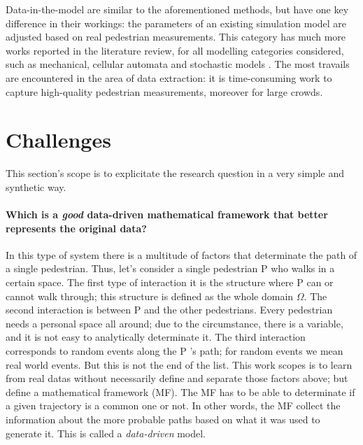 \documentclass[class=article, crop=false]{standalone}
\begin{document}
Data-in-the-model are similar to the aforementioned methods, but have one key difference in their workings: the parameters of an existing simulation model are adjusted based on real pedestrian measurements. This category has much more works reported in the literature review, for all modelling categories considered, such as mechanical, cellular automata and stochastic models \cite{crowd_simulation,interactive_crowd_simulation,data_driven_simulation}. The most travails are encountered in the area of data extraction: it is time-consuming work to capture high-quality pedestrian measurements, moreover for large crowds.


\section{Challenges}
This section's scope is to explicitate the research question in a very simple and synthetic way.

\paragraph{Which is a \emph{good} data-driven mathematical framework that better represents the original data?}
In this type of system there is a multitude of factors that determinate the path of a single pedestrian. 
Thus, let’s consider a single pedestrian P who walks in a certain space. 
The first type of interaction it is the structure where P can or cannot walk through; this structure is defined as the whole domain $\Omega$. 
The second interaction is between P and the other pedestrians. 
Every pedestrian needs a personal space all around; due to the circumstance, there is a variable, and it is not easy to analytically determinate it.
The third interaction corresponds to random events along the P ’s path; for random events we mean real world events.
But this is not the end of the list.
This work scopes is to learn from real datas without necessarily define and separate those factors above; but define a mathematical framework (MF).
The MF has to be able to determinate if a given trajectory is a common one or not. 
In other words, the MF collect the information about the more probable paths based on what it was used to generate it.
This is called a \emph{data-driven} model.
\end{document}
